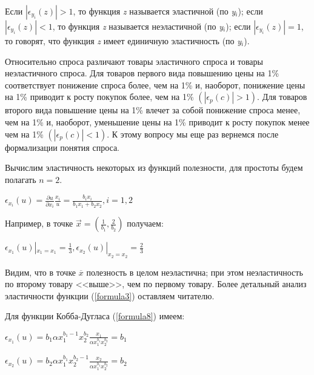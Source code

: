 \documentclass[12pt, 4paper]{book}
\begin{document}
{\par
Если $\left|\epsilon_{y_{i}}(z)\right|>1$, то функция \textit{z} называется эластичной (по \textit{y${}_{i}$}); если $\left|\epsilon_{y_{i}}(z)\right|<1$, то функция \textit{z} называется неэластичной (по \textit{y${}_{i}$}); если $\left|\epsilon_{y_{i}}(z)\right|=1$, то говорят, что функция \textit{z} имеет единичную эластичность (по \textit{y${}_{i}$}).

\par
Относительно спроса различают товары эластичного спроса и товары неэластичного спроса. Для товаров первого вида повышению цены на 1\% соответствует понижение спроса более, чем на 1\% и, наоборот, понижение цены на 1\% приводит к росту покупок более, чем на 1\% $\left(\left|\epsilon_{p}(c)\right|>1\right)$. Для товаров второго вида повышение цены на 1\% влечет за собой понижение спроса менее, чем на 1\% и, наоборот, уменьшение цены на 1\% приводит к росту покупок менее чем на 1\% $\left(\left|\epsilon_{p}(c)\right|<1 \right)$. К этому вопросу мы еще раз вернемся после формализации понятия спроса.

\par
Вычислим эластичность некоторых из функций полезности, для простоты будем полагать $n=2$.

\begin{center}
$\epsilon_{x_{i}}(u)=\frac{\partial u }{\partial x_i}\frac{x_i}{u}=\frac{b_i x_i}{b_1 x_1 + b_2 x_2},i=1,2$
\end{center}

\par
Например, в точке $\vec{x}=\left(\frac{1}{b_1},\frac{2}{b_2}\right)$ получаем:

\begin{center}
$\epsilon_{x_{1}}(u)|_{x_{1}=x_{1}}=\frac{1}{3}, \epsilon_{x_{2}}(u)|_{x_{2}=x_{2}}=\frac{2}{3}$
\end{center}

\par
Видим, что в точке $\overline{x}$ полезность в целом неэластична; при этом неэластичность по второму товару <<выше>>, чем по первому товару. Более детальный анализ эластичности функции (\ref{formula3}) оставляем читателю.
 
\par
Для функции Кобба-Дугласа (\ref{formula8}) имеем: 
\begin{center}
$\epsilon_{x_1}(u)=b_1 \alpha x_{1}^{b_{1}-1}x_{2}^{b_2} \frac{x_1}{\alpha x_{1}^{b_{1}}x_{2}^{b_2}}=b_1$
\end{center}
\begin{center}
$\epsilon_{x_2}(u)=b_2 \alpha x_{1}^{b_{1}}x_{2}^{b_{2}-1} \frac{x_2}{\alpha x_{1}^{b_{1}}x_{2}^{b_2}}=b_2$
\end{center}
\par

}
\end{document}
